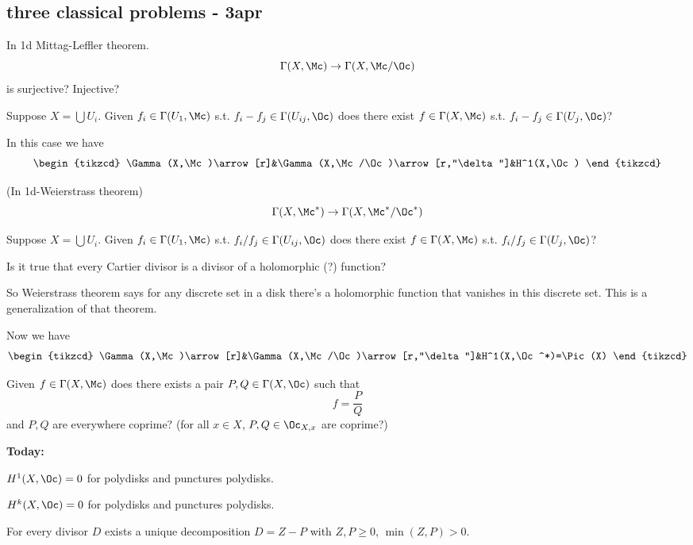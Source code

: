 \subsection{three classical problems - 3apr}
\begin{question}
	In 1d Mittag-Leffler theorem.
	\[\Gamma(X,\Mc)\to\Gamma(X,\Mc/\Oc)\]
	is surjective? Injective?
	
	Suppose $X=\bigcup U_i$. Given $f_i\in\Gamma(U_1,\Mc)$ s.t. $f_i-f_j\in\Gamma(U_{ij},\Oc)$ does there exist $f\in\Gamma(X,\Mc)$ s.t. $f_i-f_j\in\Gamma(U_{j},\Oc)$?
	
	In this case we have
	\[\begin{tikzcd}
		\Gamma(X,\Mc)\arrow[r]&\Gamma(X,\Mc/\Oc)\arrow[r,"\delta"]&H^1(X,\Oc)
	\end{tikzcd}\]
\end{question}
\begin{question}
	(In 1d-Weierstrass theorem)
	\[\Gamma(X,\Mc^*)\to\Gamma(X,\Mc^*/\Oc^*)\]
	
	Suppose $X=\bigcup U_i$. Given $f_i\in\Gamma(U_1,\Mc)$ s.t. $f_i/f_j\in\Gamma(U_{ij},\Oc)$ does there exist $f\in\Gamma(X,\Mc)$ s.t. $f_i/f_j\in\Gamma(U_{j},\Oc)$?
	
	Is it true that every Cartier divisor is a divisor of a {\color{cyan}holomorphic (?)} function?
	
	So Weierstrass theorem says for any discrete set in a disk there's a holomorphic function that vanishes in this discrete set. This is a generalization of that theorem.
	
	Now we have
	\[\begin{tikzcd}
		\Gamma(X,\Mc)\arrow[r]&\Gamma(X,\Mc/\Oc)\arrow[r,"\delta"]&H^1(X,\Oc^*)=\Pic(X)
	\end{tikzcd}\]
\end{question}
\begin{question}
	Given $f\in\Gamma(X,\Mc)$ does there exists a pair $P,Q\in\Gamma(X,\Oc)$ such that
	\[f=\frac{P}{Q}\]
	and $P,Q$ are everywhere coprime? (for all $x\in X$, $P,Q\in\Oc_{X,x}$ are coprime?) 
\end{question}
\textbf{Today:}
\begin{claim}
	$H^1(X,\Oc)=0$ for polydisks and punctures polydisks.
\end{claim}
\begin{coro}
	$H^k(X,\Oc)=0$ for polydisks and punctures polydisks.
\end{coro}
\begin{lemma}
	For every divisor $D$ exists a unique decomposition $D=Z-P$ with $Z,P\geq0$, $\min(Z,P)>0$.
\end{lemma}
